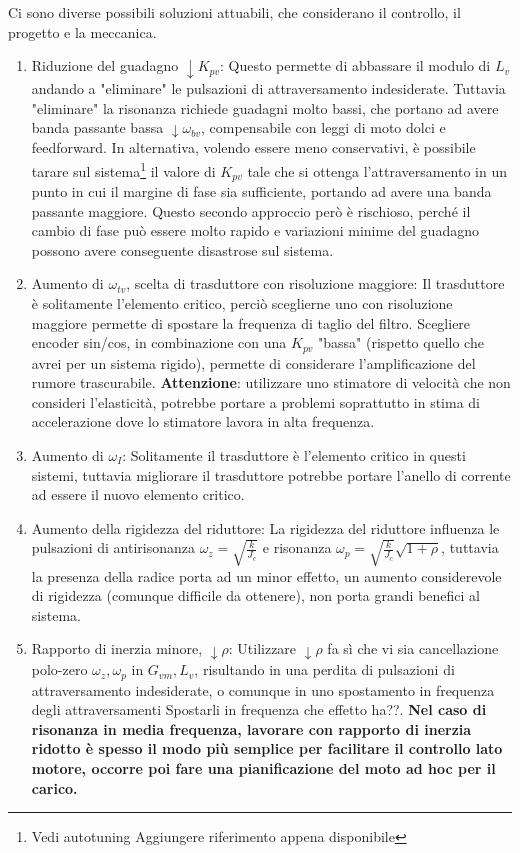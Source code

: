 Ci sono diverse possibili soluzioni attuabili, che considerano il controllo, il progetto e la meccanica.
\begin{enumerate}[label=\roman*.]
    \item Riduzione del guadagno \(\downarrow K_{pv}\): Questo permette di abbassare il modulo di \(L_v\) andando a "eliminare" le pulsazioni di attraversamento indesiderate. Tuttavia "eliminare" la risonanza richiede guadagni molto bassi, che portano ad avere banda passante bassa \(\downarrow \omega_{bv}\), compensabile con leggi di moto dolci e feedforward.
    In alternativa, volendo essere meno conservativi, è possibile tarare sul sistema\footnote{Vedi autotuning {\color{red} Aggiungere riferimento appena disponibile}} il valore di \(K_{pv}\) tale che si ottenga l'attraversamento in un punto in cui il margine di fase sia sufficiente, portando ad avere una banda passante maggiore. Questo secondo approccio però è rischioso, perché il cambio di fase può essere molto rapido e variazioni minime del guadagno possono avere conseguente disastrose sul sistema.
    \item Aumento di \(\omega_{tv}\), scelta di trasduttore con risoluzione maggiore: Il trasduttore è solitamente l'elemento critico, perciò sceglierne uno con risoluzione maggiore permette di spostare la frequenza di taglio del filtro. Scegliere encoder sin/cos, in combinazione con una \(K_{pv}\) "bassa" (rispetto quello che avrei per un sistema rigido), permette di considerare l'amplificazione del rumore trascurabile.
    \textbf{Attenzione}: utilizzare uno stimatore di velocità che non consideri l'elasticità, potrebbe portare a problemi soprattutto in stima di accelerazione dove lo stimatore lavora in alta frequenza.
    \item Aumento di \(\omega_I\): Solitamente il trasduttore è l'elemento critico in questi sistemi, tuttavia migliorare il trasduttore potrebbe portare l'anello di corrente ad essere il nuovo elemento critico.
    \item Aumento della rigidezza del riduttore: La rigidezza del riduttore influenza le pulsazioni di antirisonanza \(\omega_z = \sqrt{\frac{k}{J_c}}\) e risonanza \(\omega_p = \sqrt{\frac{k}{J_c}}\sqrt{1+\rho}\), tuttavia la presenza della radice porta ad un minor effetto, un aumento considerevole di rigidezza (comunque difficile da ottenere), non porta grandi benefici al sistema. 
    \item Rapporto di inerzia minore, \(\downarrow \rho\): Utilizzare \(\downarrow \rho\) fa sì che vi sia cancellazione polo-zero \(\omega_z,\omega_p\) in \(G_{vm}, L_v\), risultando in una perdita di pulsazioni di attraversamento indesiderate, o comunque in uno spostamento in frequenza degli attraversamenti {\color{red}Spostarli in frequenza che effetto ha??}. \textbf{Nel caso di risonanza in media frequenza, lavorare con rapporto di inerzia ridotto è spesso il modo più semplice per facilitare il controllo lato motore, occorre poi fare una pianificazione del moto ad hoc per il carico.}

\end{enumerate}
